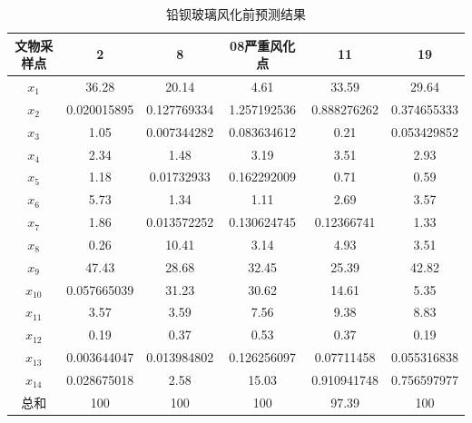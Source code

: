 \documentclass[UTF8]{ctexart}
\begin{document}
                \begin{table}[H]
                    \centering
                    \caption{铅钡玻璃风化前预测结果}
                    \begin{tabular}{|c|c|c|c|c|c|}
                        \hline
                        文物采样点 & 2           & 8           & 08严重风化点 & 11          & 19          \\ \hline
                        $x_1$      & 36.28       & 20.14       & 4.61         & 33.59       & 29.64       \\ \hline
                        $x_2$      & 0.020015895 & 0.127769334 & 1.257192536  & 0.888276262 & 0.374655333 \\ \hline
                        $x_3$      & 1.05        & 0.007344282 & 0.083634612  & 0.21        & 0.053429852 \\ \hline
                        $x_4$      & 2.34        & 1.48        & 3.19         & 3.51        & 2.93        \\ \hline
                        $x_5$      & 1.18        & 0.01732933  & 0.162292009  & 0.71        & 0.59        \\ \hline
                        $x_6$      & 5.73        & 1.34        & 1.11         & 2.69        & 3.57        \\ \hline
                        $x_7$      & 1.86        & 0.013572252 & 0.130624745  & 0.12366741  & 1.33        \\ \hline
                        $x_8$      & 0.26        & 10.41       & 3.14         & 4.93        & 3.51        \\ \hline
                        $x_9$      & 47.43       & 28.68       & 32.45        & 25.39       & 42.82       \\ \hline
                        $x_{10}$   & 0.057665039 & 31.23       & 30.62        & 14.61       & 5.35        \\ \hline
                        $x_{11}$   & 3.57        & 3.59        & 7.56         & 9.38        & 8.83        \\ \hline
                        $x_{12}$   & 0.19        & 0.37        & 0.53         & 0.37        & 0.19        \\ \hline
                        $x_{13}$   & 0.003644047 & 0.013984802 & 0.126256097  & 0.07711458  & 0.055316838 \\ \hline
                        $x_{14}$   & 0.028675018 & 2.58        & 15.03        & 0.910941748 & 0.756597977 \\ \hline
                        总和       & 100         & 100         & 100          & 97.39       & 100         \\ \hline
                    \end{tabular}
                \end{table}
\end{document}
